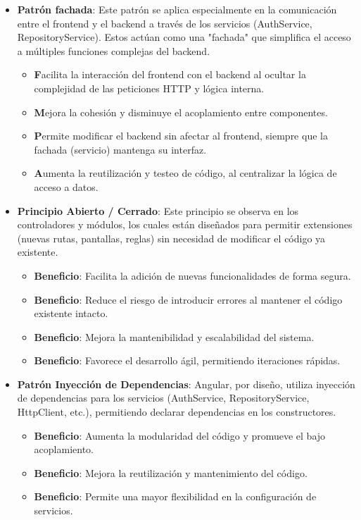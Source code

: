 \begin{itemize}
    \item \textbf{Patrón fachada}: Este patrón se aplica especialmente en la comunicación entre el frontend y el backend a través de los servicios (AuthService, RepositoryService). Estos actúan como una "fachada" que simplifica el acceso a múltiples funciones complejas del backend.
    \begin{itemize}
        \item \textbf Facilita la interacción del frontend con el backend al ocultar la complejidad de las peticiones HTTP y lógica interna.
        \item \textbf Mejora la cohesión y disminuye el acoplamiento entre componentes.
        \item \textbf Permite modificar el backend sin afectar al frontend, siempre que la fachada (servicio) mantenga su interfaz.
        \item \textbf Aumenta la reutilización y testeo de código, al centralizar la lógica de acceso a datos.
    \end{itemize}
    
    \item \textbf{Principio Abierto / Cerrado}: Este principio se observa en los controladores y módulos, los cuales están diseñados para permitir extensiones (nuevas rutas, pantallas, reglas) sin necesidad de modificar el código ya existente.
    \begin{itemize}
        \item \textbf{Beneficio}: Facilita la adición de nuevas funcionalidades de forma segura.
        \item \textbf{Beneficio}: Reduce el riesgo de introducir errores al mantener el código existente intacto.
        \item \textbf{Beneficio}: Mejora la mantenibilidad y escalabilidad del sistema.
        \item \textbf{Beneficio}: Favorece el desarrollo ágil, permitiendo iteraciones rápidas.
    \end{itemize}
    
    \item \textbf{Patrón Inyección de Dependencias}:  Angular, por diseño, utiliza inyección de dependencias para los servicios (AuthService, RepositoryService, HttpClient, etc.), permitiendo declarar dependencias en los constructores.
    \begin{itemize}
        \item \textbf{Beneficio}: Aumenta la modularidad del código y promueve el bajo acoplamiento.
        \item \textbf{Beneficio}: Mejora la reutilización y mantenimiento del código.
        \item \textbf{Beneficio}: Permite una mayor flexibilidad en la configuración de servicios.
    \end{itemize}
    

\end{itemize}
